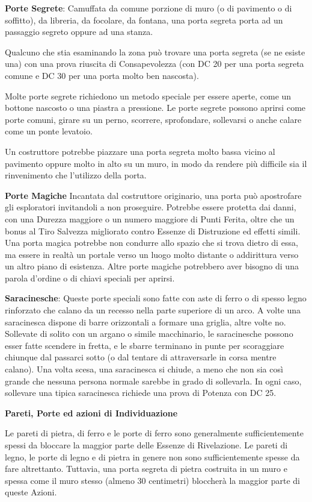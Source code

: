 \documentclass[a4paper,11pt,twoside,openany]{book}
\begin{document}
\textbf{Porte Segrete}: Camuffata da comune porzione di muro (o di pavimento o di soffitto), da libreria, da focolare, da fontana, una porta segreta porta ad un passaggio segreto oppure ad una stanza.

Qualcuno che stia esaminando la zona può trovare una porta segreta (se ne esiste una) con una prova riuscita di Consapevolezza (con DC 20 per una porta segreta comune e DC 30 per una porta molto ben nascosta).

Molte porte segrete richiedono un metodo speciale per essere aperte, come un bottone nascosto o una piastra a pressione. Le porte segrete possono aprirsi come porte comuni, girare su un perno, scorrere, sprofondare, sollevarsi o anche calare come un ponte levatoio.

Un costruttore potrebbe piazzare una porta segreta molto bassa vicino al pavimento oppure molto in alto su un muro, in modo da rendere più difficile sia il rinvenimento che l'utilizzo della porta.

\textbf{Porte Magiche} Incantata dal costruttore originario, una porta può apostrofare gli esploratori invitandoli a non proseguire. Potrebbe essere protetta dai danni, con una Durezza maggiore o un numero maggiore di Punti Ferita, oltre che un bonus al Tiro Salvezza migliorato contro Essenze di Distruzione ed effetti simili. Una porta magica potrebbe non condurre allo spazio che si trova dietro di essa, ma essere in realtà un portale verso un luogo molto distante o addirittura verso un altro piano di esistenza. Altre porte magiche potrebbero aver bisogno di una parola d'ordine o di chiavi speciali per aprirsi.

\textbf{Saracinesche}: Queste porte speciali sono fatte con aste di ferro o di spesso legno rinforzato che calano da un recesso nella parte superiore di un arco. A volte una saracinesca dispone di barre orizzontali a formare una griglia, altre volte no. Sollevate di solito con un argano o simile macchinario, le saracinesche possono esser fatte scendere in fretta, e le sbarre terminano in punte per scoraggiare chiunque dal passarci sotto (o dal tentare di attraversarle in corsa mentre calano). Una volta scesa, una saracinesca si chiude, a meno che non sia così grande che nessuna persona normale sarebbe in grado di sollevarla. In ogni caso, sollevare una tipica saracinesca richiede una prova di Potenza con DC 25.

\textbf{Pareti, Porte ed azioni di Individuazione}

Le pareti di pietra, di ferro e le porte di ferro sono generalmente sufficientemente spessi da bloccare la maggior parte delle Essenze di Rivelazione. Le pareti di legno, le porte di legno e di pietra in genere non sono sufficientemente spesse da fare altrettanto. Tuttavia, una porta segreta di pietra costruita in un muro e spessa come il muro stesso (almeno 30 centimetri) bloccherà la maggior parte di queste Azioni.
\end{document}
